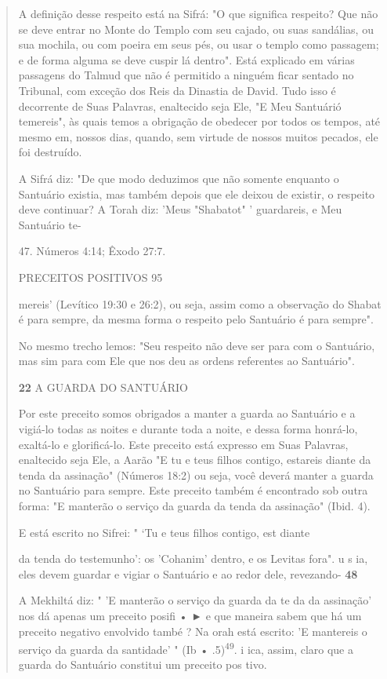 \begin{quote}
A definição desse respeito está na Sifrá: "O que significa respeito? Que
não se deve entrar no Monte do Templo com seu cajado, ou suas
sandá­lias, ou sua mochila, ou com poeira em seus pés, ou usar o templo
como passa­gem; e de forma alguma se deve cuspir lá dentro". Está
explicado em várias passagens do Talmud que não é permitido a ninguém
ficar sentado no Tribu­nal, com exceção dos Reis da Dinastia de David.
Tudo isso é decorrente de Suas Palavras, enaltecido seja Ele, "E Meu
Santuárió temereis", às quais temos a obri­gação de obedecer por todos
os tempos, até mesmo em, nossos dias, quando, sem virtude de nossos
muitos pecados, ele foi destruído.

A Sifrá diz: "De que modo deduzimos que não somente enquanto o Santuário
existia, mas também depois que ele deixou de existir, o respeito deve
continuar? A Torah diz: 'Meus "Shabatot" ' guardareis, e Meu Santuário
te-

47. Números 4:14; Êxodo 27:7.

PRECEITOS POSITIVOS 95

mereis' (Levítico 19:30 e 26:2), ou seja, assim como a observação do
Shabat é para sempre, da mesma forma o respeito pelo Santuário é para
sempre".

No mesmo trecho lemos: "Seu respeito não deve ser para com o San­tuário,
mas sim para com Ele que nos deu as ordens referentes ao Santuário".

\textbf{22} A GUARDA DO SANTUÁRIO

Por este preceito somos obrigados a manter a guarda ao Santuário e a
vigiá-lo todas as noites e durante toda a noite, e dessa forma honrá-lo,
exaltá-lo e glorificá-lo. Este preceito está expresso em Suas Palavras,
enaltecido seja Ele, a Aarão "E tu e teus filhos contigo, estareis
diante da tenda da assinação" (Nú­meros 18:2) ou seja, você deverá
manter a guarda no Santuário para sempre. Este preceito também é
encontrado sob outra forma: "E manterão o serviço da guarda da tenda da
assinação" (Ibid. 4).

E está escrito no Sifrei: " `Tu e teus filhos contigo, est diante

da tenda do testemunho': os 'Cohanim' dentro, e os Levitas fora". u s
ia, eles devem guardar e vigiar o Santuário e ao redor dele, revezando-
\textbf{48}

A Mekhiltá diz: " 'E manterão o serviço da guarda da te da da
assi­nação' nos dá apenas um preceito posifi • ► e que maneira sabem que
há um preceito negativo envolvido també ? Na orah está escrito: 'E
mantereis o serviço da guarda da santidade' " (Ib •
.5)\textsuperscript{49}. i ica, assim, claro que a guarda do Santuário
constitui um preceito pos tivo.


\end{quote}
